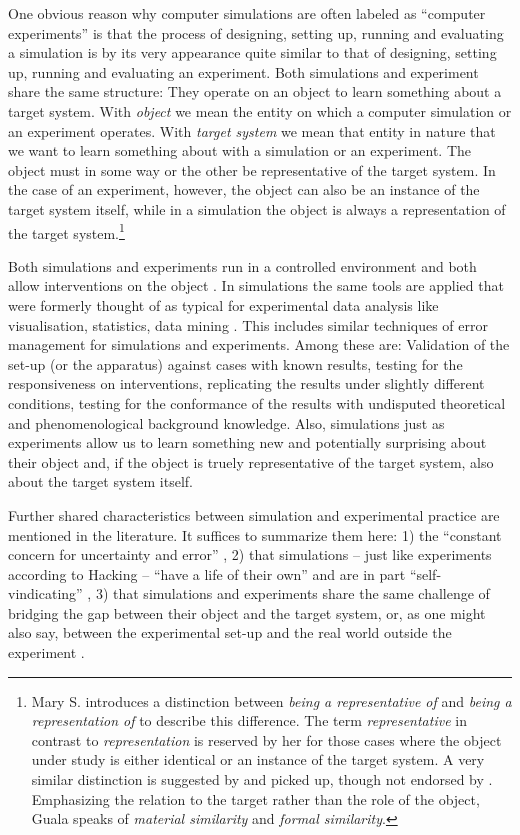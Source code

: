 \documentclass[12pt, a4paper]{article}
\numberwithin{equation}{section}
\begin{document}
One obvious reason why computer simulations are often labeled as
``computer experiments'' is that the process of designing, setting up,
running and evaluating a simulation is by its very appearance quite
similar to that of designing, setting up, running and evaluating an
experiment. Both simulations and experiment share the same structure:
They operate on an object to learn something about a target
system. With \emph{object} we mean the entity on which a computer
simulation or an experiment operates. With \emph{target system} we
mean that entity in nature that we want to learn something about with
a simulation or an experiment. The object must in some way or the
other be representative of the target system. In the case of an
experiment, however, the object can also be an instance of the target
system itself, while in a simulation the object is always a
representation of the target system.\footnote{Mary
  S. \cite{morgan:2003} introduces a distinction between {\em being a
    representative of} and {\em being a representation of} to describe
  this difference. The term {\em representative} in contrast to {\em
    representation} is reserved by her for those cases where the
  object under study is either identical or an instance of the target
  system. A very similar distinction is suggested by \cite{guala:2002}
  and picked up, though not endorsed by
  \citet{winsberg:2009}. Emphasizing the relation to the target rather
  than the role of the object, Guala speaks of {\em material
    similarity} and {\em formal similarity}.}

Both simulations and experiments run in a controlled environment and
both allow interventions on the object \cite[p. 487]{parker:2009}. In
simulations the same tools are applied that were formerly thought of
as typical for experimental data analysis like visualisation,
statistics, data mining \citep[p. 33]{winsberg:2010}.  This includes
similar techniques of error management for simulations and
experiments. Among these are: Validation of the set-up (or the
apparatus) against cases with known results, testing for the
responsiveness on interventions, replicating the results under
slightly different conditions, testing for the conformance of the
results with undisputed theoretical and phenomenological background
knowledge. Also, simulations just as experiments allow us to learn
something new and potentially surprising about their object and, if
the object is truely representative of the target system, also about
the target system itself.
  
Further shared characteristics between simulation and experimental
practice are mentioned in the literature. It suffices to summarize them
here: 1) the ``constant concern for uncertainty and error'' \citep[p.
34]{winsberg:2010}, 2) that simulations -- just like experiments
according to Hacking \citep{hacking:1983} -- ``have a life of their
own'' and are in part ``self-vindicating'' \cite[p. 45]{winsberg:2010},
3) that simulations and experiments share the same challenge of bridging
the gap between their object and the target system, or, as one might
also say, between the experimental set-up and the real world outside the
experiment \citep[p. 174/175]{arnold:2008}.
  
\end{document}
